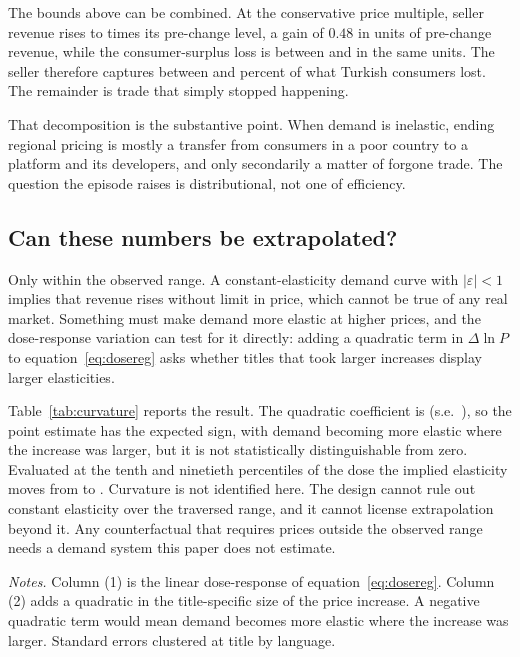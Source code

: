 \documentclass[11pt]{article}
\newcommand{\notes}[1]{%
  \par\vspace{4pt}\noindent
  \begin{minipage}{\linewidth}\setstretch{1.02}\footnotesize
  \textit{Notes.} #1\end{minipage}}
\begin{document}
The bounds above can be combined. At the conservative price multiple, seller revenue rises to
\revAct{} times its pre-change level, a gain of \ensuremath{0.48} in units of pre-change revenue,
while the consumer-surplus loss is between \csActLo{} and \csActHi{} in the same units. The seller
therefore captures between \transferLo{} and \transferHi{} percent of what Turkish consumers lost.
The remainder is trade that simply stopped happening.

That decomposition is the substantive point. When demand is inelastic, ending regional
pricing is mostly a transfer from consumers in a poor country to a platform and its developers, and
only secondarily a matter of forgone trade. The question the episode raises is distributional, not one of efficiency.

\subsection{Can these numbers be extrapolated?}\label{sec:curvature}

Only within the observed range. A constant-elasticity demand curve with
$|\varepsilon| < 1$ implies that revenue rises without limit in price, which cannot be true of any
real market. Something must make demand more elastic at higher prices, and the dose-response
variation can test for it directly: adding a quadratic term in $\Delta \ln P$ to
equation~\eqref{eq:dosereg} asks whether titles that took larger increases display larger
elasticities.

Table~\ref{tab:curvature} reports the result. The quadratic coefficient is \bDoseSq{} (s.e.\
\seDoseSq), so the point estimate has the expected sign, with demand becoming more elastic where
the increase was larger, but it is not statistically distinguishable from zero. Evaluated at the
tenth and ninetieth percentiles of the dose the implied elasticity moves from \epsDTen{} to
\epsDNinety. Curvature is not identified here. The design cannot rule out constant elasticity over
the traversed range, and it cannot license extrapolation beyond it. Any counterfactual that requires prices outside the observed range needs a demand system
this paper does not estimate.

\begin{table}[htbp]
\centering
\caption{Does the elasticity vary with the size of the increase?}\label{tab:curvature}
\vspace{2pt}
{\footnotesize}
\notes{Column (1) is the linear dose-response of equation~\eqref{eq:dosereg}. Column (2) adds a
quadratic in the title-specific size of the price increase. A negative quadratic term would mean
demand becomes more elastic where the increase was larger. Standard errors clustered at title by
language.}
\end{table}
\end{document}
